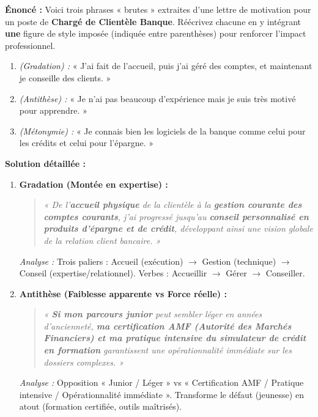 \documentclass[11pt]{article}
\begin{document}
\begin{exoresolu}
\textbf{Énoncé :} Voici trois phrases « brutes » extraites d'une lettre de motivation pour un poste de \textbf{Chargé de Clientèle Banque}. Réécrivez chacune en y intégrant \textbf{une} figure de style imposée (indiquée entre parenthèses) pour renforcer l'impact professionnel.

\begin{enumerate}
\item \textit{(Gradation) :} « J'ai fait de l'accueil, puis j'ai géré des comptes, et maintenant je conseille des clients. »
\item \textit{(Antithèse) :} « Je n'ai pas beaucoup d'expérience mais je suis très motivé pour apprendre. »
\item \textit{(Métonymie) :} « Je connais bien les logiciels de la banque comme celui pour les crédits et celui pour l'épargne. »
\end{enumerate}

\tcblower
\textbf{Solution détaillée :}

\begin{enumerate}
\item \textbf{Gradation (Montée en expertise) :}
\begin{quote}
\textit{« De l'\textbf{accueil physique} de la clientèle à la \textbf{gestion courante des comptes courants}, j'ai progressé jusqu'au \textbf{conseil personnalisé en produits d'épargne et de crédit}, développant ainsi une vision globale de la relation client bancaire. »}
\end{quote}
\textit{Analyse :} Trois paliers : Accueil (exécution) $\rightarrow$ Gestion (technique) $\rightarrow$ Conseil (expertise/relationnel). Verbes : Accueillir $\rightarrow$ Gérer $\rightarrow$ Conseiller.

\item \textbf{Antithèse (Faiblesse apparente vs Force réelle) :}
\begin{quote}
\textit{« \textbf{Si mon parcours junior} peut sembler léger en années d'ancienneté, \textbf{ma certification AMF (Autorité des Marchés Financiers) et ma pratique intensive du simulateur de crédit en formation} garantissent une opérationnalité immédiate sur les dossiers complexes. »}
\end{quote}
\textit{Analyse :} Opposition « Junior / Léger » vs « Certification AMF / Pratique intensive / Opérationnalité immédiate ». Transforme le défaut (jeunesse) en atout (formation certifiée, outils maîtrisés).


\end{enumerate}
\end{exoresolu}
\end{document}
